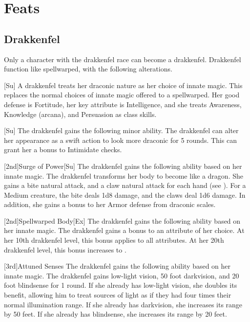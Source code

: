 \section{Feats}

    \subsection{Drakkenfel}

        Only a character with the drakkenfel race can become a drakkenfel. Drakkenfel function like spellwarped, with the following alterations.

        [Su]
        A drakkenfel treats her draconic nature as her choice of innate magic.
        This replaces the normal choices of innate magic offered to a spellwarped.
        Her good defense is Fortitude, her key attribute is Intelligence, and she treats Awareness, Knowledge (arcana), and Persuasion as class skills.

        [Su]
        The drakkenfel gains the following minor ability.
        The drakkenfel can alter her appearance as a swift action to look more draconic for 5 rounds.
        This can grant her a  bonus to Intimidate checks.

        [2nd]{Surge of Power}[Su]
        The drakkenfel gains the following ability based on her innate magic.
        The drakkenfel transforms her body to become like a dragon.
        She gains a bite natural attack, and a claw natural attack for each hand (see ).
        For a Medium creature, the bite deals 1d8 damage, and the claws deal 1d6 damage.
        In addition, she gains a  bonus to her Armor defense from draconic scales.

        [2nd]{Spellwarped Body}[Ex]
        The drakkenfel gains the following ability based on her innate magic.
        The drakkenfel gains a  bonus to an attribute of her choice.
        At her 10th drakkenfel level, this bonus applies to all attributes.
        At her 20th drakkenfel level, this bonus increases to .

        [3rd]{Attuned Senses}
        The drakkenfel gains the following ability based on her innate magic.
        The drakkenfel gains low-light vision, 50 foot darkvision, and 20 foot blindsense for 1 round.
        If she already has low-light vision, she doubles its benefit, allowing him to treat sources of light as if they had four times their normal illumination range.
        If she already has darkvision, she increases its range by 50 feet.
        If she already has blindsense, she increases its range by 20 feet.

